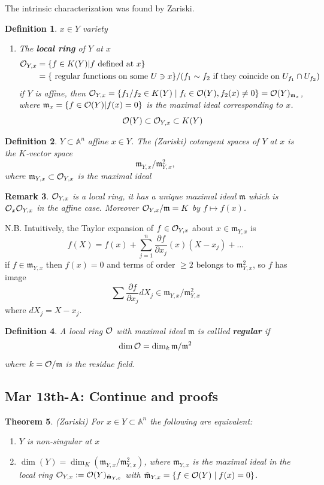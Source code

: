 \documentclass[11pt]{article}
\newtheorem{thm}{Theorem}[section]
\newtheorem{dfn}[thm]{Definition}
\newtheorem{rmk}[thm]{Remark}
\newcommand{\affn}{\mathbb A}
\newcommand{\scm}{{\mathfrak m}}
\newcommand{\calo}{{\cal O}}
\newcommand{\pd}{\partial}
\begin{document}
The intrinsic characterization was found by Zariski. 
\begin{dfn}
$x\in Y$ variety
\begin{enumerate}[label=(\arabic*)]
\item The \textbf{local ring} of $Y$ at $x$
$$
\begin{aligned}
\calo_{Y,x}&=\{f\in K(Y)|f\text{ defined  at } x\}\\
&=\{\text{ regular functions on some } U\ni x\}/(f_1\sim f_2\text{ if they coincide on } U_{f_1}\cap U_{f_2})
\end{aligned}
$$
if $Y$ is affine, then $\calo_{Y,x}=\{f_1/f_2\in K(Y) \mid f_i\in\calo(Y),f_2(x)\neq 0\}=\calo(Y)_{\scm_x}$, where $\scm_x=\{f\in\calo(Y)|f(x)=0\}$ is the maximal ideal corresponding to $x$.
$$
\calo(Y)\subset\calo_{Y,x}\subset K(Y)
$$
\end{enumerate}
\end{dfn}
\begin{dfn}
$Y\subset \affn^n$ affine $x\in Y$. The (Zariski) cotangent spaces of $Y$ at $x$ is the $K$-vector space
$$
\scm_{Y,x}/\scm_{Y,x}^2,
$$
where $\scm_{Y,x}\subset \calo_{Y,x}$ is the maximal ideal 
\end{dfn}
\begin{rmk}
$\calo_{Y,x}$ is a local ring, it has a unique maximal ideal $\scm$ which is $\calo_x\calo_{Y,x}$ in the affine case. Moreover $\calo_{Y,x}/\scm=K$ by $f\mapsto f(x)$.
\end{rmk}

N.B. Intuitively,  the Taylor expansion of $f\in \calo_{Y,x}$ about $x\in\scm_{Y,x}$ is
$$
f(X)=f(x)+\sum^n_{j=1}\frac{\pd f}{\pd x_j}(x)(X-x_j)+\dots
$$
if $f\in\scm_{Y,x}$ then $f(x)=0$ and terms of order $\geq 2$ belongs to $\scm_{Y,x}^2$, so $f$ has image
$$
\sum \frac{\pd f}{\pd x_j}dX_j\in \scm_{Y,x}/\scm_{Y,x}^2
$$
where $dX_j=X-x_j$.



\begin{dfn}
A local ring $\calo$ with maximal ideal $\scm$ is callled \textbf{regular} if 
$$
\dim \calo= \dim_k \scm/\scm^2
$$
where $k=\calo/\scm$ is the residue field.
\end{dfn}

\subsection{Mar 13th-A: Continue and proofs}
\begin{thm}(Zariski)
	For $x\in Y\subset \affn^n$ the following are equivalent:
	\begin{enumerate}[label=(\arabic*)]
		\item
		$Y$ is non-singular at $x$
		\item $\dim(Y)=\dim_K(\scm_{Y,x}/\scm_{Y,x}^2)$, where $\scm_{Y,x}$ is the maximal ideal in the local ring $\calo_{Y,x}:=\calo(Y)_{\tilde{\scm}_{Y,x}}$ with $\tilde{\scm}_{Y,x}=\{f\in\calo(Y)\mid f(x)=0\}$.
	\end{enumerate}
\end{thm}
\end{document}
